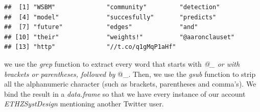 \documentclass[]{article}
\begin{document}
\begin{verbatim}
##  [1] "WSBM"              "community"         "detection"        
##  [4] "model"             "succesfully"       "predicts"         
##  [7] "future"            "edges"             "and"              
## [10] "their"             "weights!"          "@aaronclauset"    
## [13] "http"              "//t.co/q1gMqP1aHf"
\end{verbatim}

we use the \emph{grep} function to extract every word that starts with
\emph{@\_ or with brackets or parentheses, followed by }@\_. Then, we
use the \emph{gsub} function to strip all the alphanumeric character
(such as brackets, parentheses and comma's). We bind the result in a
\emph{data.frame} so that we have every instance of our account
\emph{ETHZSystDesign} mentioning another Twitter user.
\end{document}
